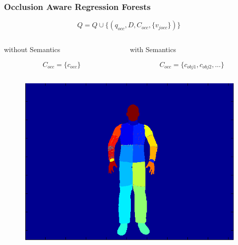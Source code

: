 \documentclass[xcolor=dvipsnames]{beamer}
\begin{document}
\begin{frame}
	\frametitle{Occlusion Aware Regression Forests}
	
	\begin{equation*}
		Q = Q \cup \{(q_{occ}, D, C_{occ}, \{v_{jocc}\})\}
	\end{equation*}
	
	\vspace{.5cm}
	\begin{columns}
		\begin{column}{.5\textwidth}
			\begin{center}
				without Semantics
			\end{center}
			\begin{equation*}
				C_{occ} = \{c_{occ}\}
			\end{equation*}
		\end{column}
		\begin{column}{.5\textwidth}
			\begin{center}
				with Semantics
			\end{center}
			\begin{equation*}
				C_{occ} = \{c_{obj1}, c_{obj2}, ...\}
			\end{equation*}
		\end{column}
	\end{columns}
	\vspace{.5cm}
	\begin{columns}
		\begin{column}{.33\textwidth}
			\begin{figure}
				\includegraphics[width=\textwidth]{img/oarf1.png}
			\end{figure}

\end{column}
\end{columns}
\end{frame}
\end{document}
